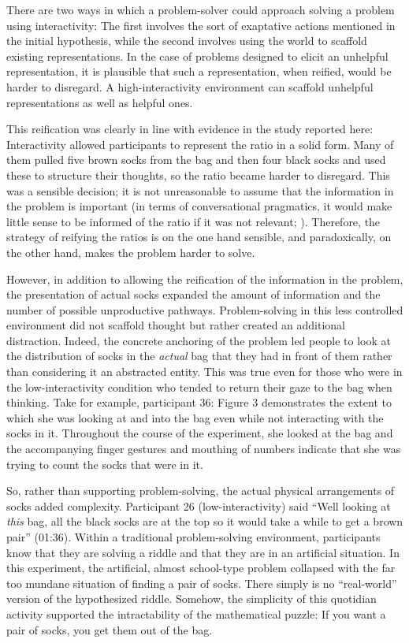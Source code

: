\documentclass{article}
\begin{document}
There are two ways in which a problem-solver could approach solving a problem using interactivity: The first involves the sort of exaptative actions mentioned in the initial hypothesis, while the second involves using the world to scaffold existing representations. In the case of problems designed to elicit an unhelpful representation, it is plausible that such a representation, when reified, would be harder to disregard. A high-interactivity environment can scaffold unhelpful representations as well as helpful ones.

This reification was clearly in line with evidence in the study reported here: Interactivity allowed participants to represent the ratio in a solid form. Many of them pulled five brown socks from the bag and then four black socks and used these to structure their thoughts, so the ratio became harder to disregard. This was a sensible decision; it is not unreasonable to assume that the information in the problem is important (in terms of conversational pragmatics, it would make little sense to be informed of the ratio if it was not relevant; \parencite{Grice1975}). Therefore, the strategy of reifying the ratios is on the one hand sensible, and paradoxically, on the other hand, makes the problem harder to solve.

However, in addition to allowing the reification of the information in the problem, the presentation of actual socks expanded the amount of information and the number of possible unproductive pathways. Problem-solving in this less controlled environment did not scaffold thought but rather created an additional distraction. Indeed, the concrete anchoring of the problem led people to look at the distribution of socks in the \emph{actual} bag that they had in front of them rather than considering it an abstracted entity. This was true even for those who were in the low-interactivity condition who tended to return their gaze to the bag when thinking. Take for example, participant 36: Figure 3 demonstrates the extent to which she was looking at and into the bag even while not interacting with the socks in it. Throughout the course of the experiment, she looked at the bag and the accompanying finger gestures and mouthing of numbers indicate that she was trying to count the socks that were in it. 

So, rather than supporting problem-solving, the actual physical arrangements of socks added complexity. Participant 26 (low-interactivity) said “Well looking at \emph{this} bag, all the black socks are at the top so it would take a while to get a brown pair” (01:36). Within a traditional problem-solving environment, participants know that they are solving a riddle and that they are in an artificial situation. In this experiment, the artificial, almost school-type problem collapsed with the far too mundane situation of finding a pair of socks. There simply is no “real-world” version of the hypothesized riddle. Somehow, the simplicity of this quotidian activity supported the intractability of the mathematical puzzle: If you want a pair of socks, you get them out of the bag.
\end{document}
